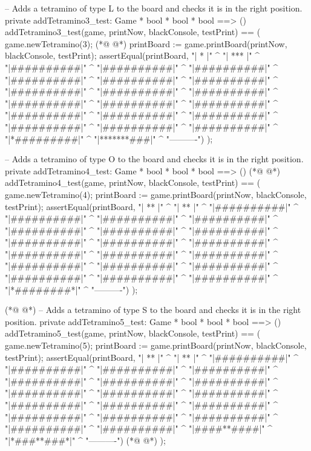 \begin{vdmpp}[breaklines=true]
  -- Adds a tetramino of type L to the board and checks it is in the right position.
  private addTetramino3_test: Game * bool * bool * bool ==> ()
  addTetramino3_test(game, printNow, blackConsole, testPrint) == (  
   game.newTetramino(3);
(*@
\label{addTetramino3:test:106}
@*)
   printBoard := game.printBoard(printNow, blackConsole, testPrint);
   assertEqual(printBoard, 
    "\n|     *    |" ^
    "\n|   ***    |" ^
    "\n|##########|" ^
    "\n|##########|" ^
    "\n|##########|" ^
    "\n|##########|" ^
    "\n|##########|" ^
    "\n|##########|" ^
    "\n|##########|" ^
    "\n|##########|" ^
    "\n|##########|" ^
    "\n|##########|" ^
    "\n|##########|" ^
    "\n|##########|" ^
    "\n|##########|" ^
    "\n|##########|" ^
    "\n|##########|" ^
    "\n|##########|" ^
    "\n|##########|" ^
    "\n|##########|" ^
    "\n|*#########|" ^
    "\n|*******###|" ^
    "\n ----------")
  );

  -- Adds a tetramino of type O to the board and checks it is in the right position.
  private addTetramino4_test: Game * bool * bool * bool ==> ()
(*@
\label{addTetramino4:test:135}
@*)
  addTetramino4_test(game, printNow, blackConsole, testPrint) == (  
   game.newTetramino(4);
   printBoard := game.printBoard(printNow, blackConsole, testPrint);
   assertEqual(printBoard, 
    "\n|    **    |" ^
    "\n|    **    |" ^
    "\n|##########|" ^
    "\n|##########|" ^
    "\n|##########|" ^
    "\n|##########|" ^
    "\n|##########|" ^
    "\n|##########|" ^
    "\n|##########|" ^
    "\n|##########|" ^
    "\n|##########|" ^
    "\n|##########|" ^
    "\n|##########|" ^
    "\n|##########|" ^
    "\n|##########|" ^
    "\n|##########|" ^
    "\n|##########|" ^
    "\n|##########|" ^
    "\n|##########|" ^
    "\n|##########|" ^
    "\n|##########|" ^
    "\n|*########*|" ^
    "\n ----------")
  );

(*@
\label{addTetramino5:test:164}
@*)
  -- Adds a tetramino of type S to the board and checks it is in the right position.
  private addTetramino5_test: Game * bool * bool * bool ==> ()
  addTetramino5_test(game, printNow, blackConsole, testPrint) == (  
   game.newTetramino(5);
   printBoard := game.printBoard(printNow, blackConsole, testPrint);
   assertEqual(printBoard, 
    "\n|    **    |" ^
    "\n|   **     |" ^
    "\n|##########|" ^
    "\n|##########|" ^
    "\n|##########|" ^
    "\n|##########|" ^
    "\n|##########|" ^
    "\n|##########|" ^
    "\n|##########|" ^
    "\n|##########|" ^
    "\n|##########|" ^
    "\n|##########|" ^
    "\n|##########|" ^
    "\n|##########|" ^
    "\n|##########|" ^
    "\n|##########|" ^
    "\n|##########|" ^
    "\n|##########|" ^
    "\n|##########|" ^
    "\n|##########|" ^
    "\n|####**####|" ^
    "\n|*###**###*|" ^
    "\n ----------")
(*@
\label{addTetramino6:test:193}
@*)
  );


\end{vdmpp}
